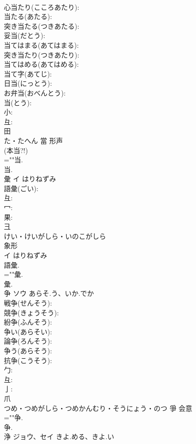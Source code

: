 \documentclass[8pt]{extreport}
\begin{document}
\begin{CJK}{UTF8}{min}
\\	心当たり(こころあたり): 
\\	当たる(あたる): 
\\	突き当たる(つきあたる): 
\\	妥当(だとう): 
\\	当てはまる(あてはまる): 
\\	突き当たり(つきあたり): 
\\	当てはめる(あてはめる): 
\\	当て字(あてじ): 
\\	日当(にっとう): 
\\	お弁当(おべんとう): 
\\	当(とう): 
\\	小: 
\\	彑: 
\\	田	
\\	た・たへん	當	形声 
\\	(本当?!)
\\	=""当.
\\	当.
\\	彙	イ	はりねずみ		
\\	語彙(ごい): 
\\	彑: 
\\	冖: 
\\	果: 
\\	彐	
\\	けい・けいがしら・いのこがしら	
\\	象形 
\\	イ はりねずみ 
\\	語彙.	
\\	=""彙.
\\	彙.
\\	争	ソウ	あらそ.う、いか.でか		
\\	戦争(せんそう): 
\\	競争(きょうそう): 
\\	紛争(ふんそう): 
\\	争い(あらそい): 
\\	論争(ろんそう): 
\\	争う(あらそう): 
\\	抗争(こうそう): 
\\	勹: 
\\	彑: 
\\	亅: 
\\	爪	
\\	つめ・つめがしら・つめかんむり・そうにょう・のつ	爭	会意 
\\	=""争.
\\	争.
\\	浄	ジョウ、セイ	きよ.める、きよ.い		

\end{CJK}
\end{document}
